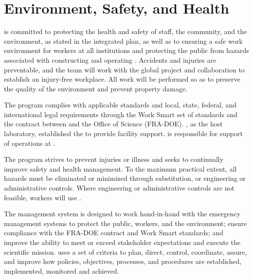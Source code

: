 \chapter{Environment, Safety, and Health}
\label{vl:tc-ESH}

\begin{comment}
A strong \dword{esh} program is essential to successfully complete
\dword{lbnf} and \dword{dune} at \dword{surf}. %
\dword{lbnf-dune} is internationally designed, coordinated and funded
through collaborating laboratories and universities.  \dword{lbnf}
comprises the world's highest intensity neutrino beam at \fnal and the
infrastructure necessary to support the large cryogenic experimental
detectors at \dword{surf}.
\end{comment}

 is committed to protecting the health and safety of
staff, the community, and the environment, as stated in the
 integrated  plan, as well as to ensuring a
safe work environment for  workers at all institutions and
protecting the public from hazards associated with constructing and
operating .  Accidents and injuries are preventable, and
the  team will work with the global 
project and collaboration to establish an injury-free workplace.
All work will be performed so as to preserve  the quality of the environment and
prevent property damage.

The   program complies with applicable
standards and local, state, federal, and international legal
requirements through the  Work Smart set of standards and the
contract between  and the 
Office of Science (FRA-DOE). \fnal, as the host laboratory,
established the  to provide facility support.
 is responsible for support of 
operations at .

The   program strives to prevent
injuries or illness and seeks to continually improve safety and health
management.  To the maximum practical extent, all hazards must be
eliminated or minimized through substitution, or engineering or
administrative controls.  Where engineering or administrative controls
are not feasible, workers will use .

The   management system is
designed to work hand-in-hand with the  emergency
management systems to protect the public, workers, and the environment;
ensure compliance with the FRA-DOE contract and \fnal Work Smart
standards; and improve the  ability to meet or
exceed stakeholder expectations and execute the
scientific mission.   uses a set of criteria to plan, direct,
control, coordinate, assure, and improve how  policies,
objectives, processes, and procedures are established, implemented,
monitored and achieved.

